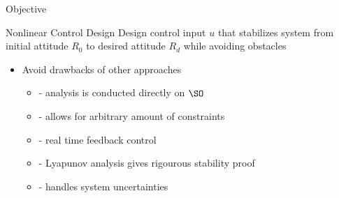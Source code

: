 \begin{frame}[t]{Objective} %

  \begin{block}{Nonlinear Control Design}
    Design control input \( u \) that stabilizes system from initial attitude \( R_0 \) to desired attitude \( R_d \) while avoiding obstacles
  \end{block}
  \pause
  \vs
  \begin{itemize}
    \item Avoid drawbacks of other approaches 
    \begin{itemize}
      \item {} - analysis is conducted directly on \( \SO \) 
      \item {} - allows for arbitrary amount of constraints
      \item {} - real time feedback control
      \item {} - Lyapunov analysis gives rigourous stability proof
      \item {} - handles system uncertainties
    \end{itemize}
  \end{itemize}
\end{frame}